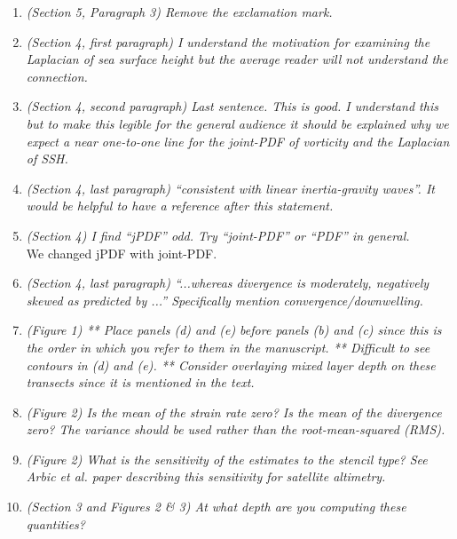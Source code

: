 \documentclass[11pt]{article}
\begin{document}
\begin{enumerate}
\item {\it (Section 5, Paragraph 3) Remove the exclamation mark.}

\item {\it (Section 4, first paragraph) I understand the motivation for examining the Laplacian of
      sea surface height but the average reader will not understand the connection.}

\item {\it (Section 4, second paragraph) Last sentence. This is good. I understand this but to
        make this legible for the general audience it should be explained why we expect a near
        one-to-one line for the joint-PDF of vorticity and the Laplacian of SSH.}

\item {\it (Section 4, last paragraph) ``consistent with linear inertia-gravity waves''.
        It would be
        helpful to have a reference after this statement.}

\item {\it (Section 4) I find “jPDF” odd. Try “joint-PDF” or “PDF” in general.}\\

We changed jPDF with joint-PDF.

\item {\it (Section 4, last paragraph) ``...whereas divergence is moderately, negatively skewed as
        predicted by ...'' Specifically mention convergence/downwelling.}

\item {\it (Figure 1) ** Place panels (d) and (e) before panels (b) and (c) since this is the order
        in which you refer to them in the manuscript. ** Difficult to see contours in (d) and
        (e). ** Consider overlaying mixed layer depth on these transects since it is mentioned
        in the text.}

\item {\it (Figure 2) Is the mean of the strain rate zero? Is the mean of the divergence zero? The
        variance should be used rather than the root-mean-squared (RMS).}

\item {\it (Figure 2) What is the sensitivity of the estimates to the stencil type? See Arbic et al.
        paper describing this sensitivity for satellite altimetry.}

\item {\it (Section 3 and Figures 2 \& 3) At what depth are you computing these quantities?}


\end{enumerate}
\end{document}
